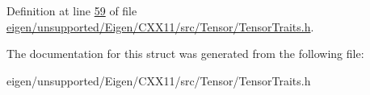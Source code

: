 Definition at line \hyperlink{eigen_2unsupported_2_eigen_2_c_x_x11_2src_2_tensor_2_tensor_traits_8h_source_l00059}{59} of file \hyperlink{eigen_2unsupported_2_eigen_2_c_x_x11_2src_2_tensor_2_tensor_traits_8h_source}{eigen/unsupported/\+Eigen/\+C\+X\+X11/src/\+Tensor/\+Tensor\+Traits.\+h}.



The documentation for this struct was generated from the following file\+:\begin{DoxyCompactItemize}
\item 
eigen/unsupported/\+Eigen/\+C\+X\+X11/src/\+Tensor/\+Tensor\+Traits.\+h\end{DoxyCompactItemize}
